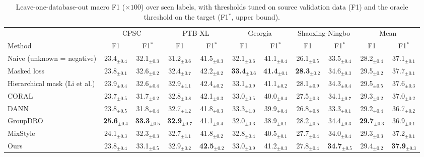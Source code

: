 \begin{table}
\centering
\footnotesize
\setlength{\tabcolsep}{3pt}
\caption{Leave-one-database-out macro F1 ($\times 100$) over seen labels, with thresholds tuned on source validation data (F1) and the oracle threshold on the target (F1$^{*}$, upper bound).}
\label{tab:loso_f1}
\begin{tabular}{lcccccccccc}
\toprule
 & \multicolumn{2}{c}{CPSC} & \multicolumn{2}{c}{PTB-XL} & \multicolumn{2}{c}{Georgia} & \multicolumn{2}{c}{Shaoxing-Ningbo} & \multicolumn{2}{c}{Mean} \\
\cmidrule(lr){2-3} \cmidrule(lr){4-5} \cmidrule(lr){6-7} \cmidrule(lr){8-9} \cmidrule(lr){10-11}
Method & F1 & F1$^{*}$ & F1 & F1$^{*}$ & F1 & F1$^{*}$ & F1 & F1$^{*}$ & F1 & F1$^{*}$ \\
\midrule
Naive (unknown = negative) & 23.4$_{\pm 0.4}$ & 32.1$_{\pm 0.3}$ & 31.2$_{\pm 0.6}$ & 41.5$_{\pm 0.3}$ & 32.1$_{\pm 0.6}$ & 41.1$_{\pm 0.4}$ & 26.1$_{\pm 0.5}$ & 33.5$_{\pm 0.4}$ & 28.2$_{\pm 0.4}$ & 37.1$_{\pm 0.1}$ \\
Masked loss & 23.8$_{\pm 0.1}$ & 32.6$_{\pm 0.2}$ & 32.4$_{\pm 0.7}$ & 42.2$_{\pm 0.2}$ & \textbf{33.4}$_{\pm 0.6}$ & \textbf{41.4}$_{\pm 0.1}$ & \textbf{28.3}$_{\pm 0.2}$ & 34.6$_{\pm 0.3}$ & 29.5$_{\pm 0.2}$ & 37.7$_{\pm 0.1}$ \\
Hierarchical mask (Li et al.) & 23.9$_{\pm 0.4}$ & 32.6$_{\pm 0.4}$ & 32.9$_{\pm 1.1}$ & 42.4$_{\pm 0.2}$ & 33.1$_{\pm 0.9}$ & 41.1$_{\pm 0.2}$ & 28.1$_{\pm 0.9}$ & 34.3$_{\pm 0.4}$ & 29.5$_{\pm 0.5}$ & 37.6$_{\pm 0.3}$ \\
CORAL & 23.7$_{\pm 0.5}$ & 31.7$_{\pm 0.2}$ & 32.8$_{\pm 0.8}$ & 42.1$_{\pm 0.3}$ & 33.0$_{\pm 0.5}$ & 40.0$_{\pm 0.4}$ & 27.5$_{\pm 0.3}$ & 34.1$_{\pm 0.7}$ & 29.3$_{\pm 0.2}$ & 37.0$_{\pm 0.2}$ \\
DANN & 23.8$_{\pm 0.5}$ & 31.8$_{\pm 0.4}$ & 32.7$_{\pm 1.2}$ & 41.8$_{\pm 0.3}$ & 33.3$_{\pm 1.0}$ & 39.9$_{\pm 0.4}$ & 26.8$_{\pm 0.8}$ & 33.3$_{\pm 0.1}$ & 29.2$_{\pm 0.4}$ & 36.7$_{\pm 0.2}$ \\
GroupDRO & \textbf{25.6}$_{\pm 0.4}$ & \textbf{33.3}$_{\pm 0.5}$ & \textbf{32.9}$_{\pm 0.7}$ & 41.1$_{\pm 0.4}$ & 32.0$_{\pm 0.3}$ & 38.9$_{\pm 0.1}$ & 28.2$_{\pm 0.5}$ & 34.4$_{\pm 0.3}$ & \textbf{29.7}$_{\pm 0.3}$ & 36.9$_{\pm 0.1}$ \\
MixStyle & 24.1$_{\pm 0.3}$ & 32.3$_{\pm 0.3}$ & 32.7$_{\pm 1.1}$ & 41.8$_{\pm 0.2}$ & 32.8$_{\pm 0.4}$ & 40.5$_{\pm 0.1}$ & 27.7$_{\pm 0.4}$ & 34.0$_{\pm 0.4}$ & 29.3$_{\pm 0.3}$ & 37.2$_{\pm 0.1}$ \\
\midrule
Ours & 23.8$_{\pm 0.4}$ & 33.1$_{\pm 0.5}$ & 32.9$_{\pm 0.2}$ & \textbf{42.5}$_{\pm 0.2}$ & 33.0$_{\pm 0.9}$ & 41.2$_{\pm 0.3}$ & 27.8$_{\pm 0.4}$ & \textbf{34.7}$_{\pm 0.5}$ & 29.4$_{\pm 0.2}$ & \textbf{37.9}$_{\pm 0.3}$ \\
\bottomrule
\end{tabular}
\end{table}

